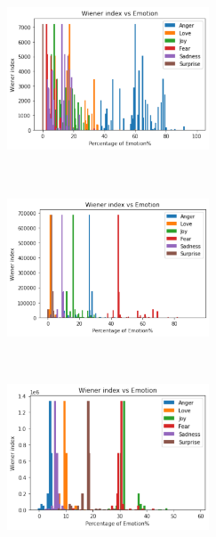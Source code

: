 \documentclass[acmtog]{acmart}
\begin{document}
\begin{figure}[h]
  \begin{minipage}{.33\textwidth}
    \centering
    \includegraphics[width=6cm,height=5.5cm,keepaspectratio]{plots/weiner_anger.pdf}
  \end{minipage}%
  \begin{minipage}{.33\textwidth}
    \centering
    \includegraphics[width=6cm,height=5.5cm,keepaspectratio]{plots/weiner_fear.pdf}
  \end{minipage}%
  \begin{minipage}{.33\textwidth}
    \centering
    \includegraphics[width=6cm,height=5.5cm,keepaspectratio]{plots/weiner_joy.pdf}
  \end{minipage}
 \medskip
  \begin{minipage}{.33\textwidth}
    \centering

\end{minipage}
\end{figure}
\end{document}
